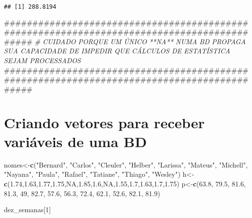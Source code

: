 \documentclass[]{article}
\newenvironment{Shaded}{\begin{snugshade}}{\end{snugshade}}
\newcommand{\KeywordTok}[1]{\textcolor[rgb]{0.13,0.29,0.53}{\textbf{#1}}}
\newcommand{\DecValTok}[1]{\textcolor[rgb]{0.00,0.00,0.81}{#1}}
\newcommand{\FloatTok}[1]{\textcolor[rgb]{0.00,0.00,0.81}{#1}}
\newcommand{\StringTok}[1]{\textcolor[rgb]{0.31,0.60,0.02}{#1}}
\newcommand{\CommentTok}[1]{\textcolor[rgb]{0.56,0.35,0.01}{\textit{#1}}}
\newcommand{\OtherTok}[1]{\textcolor[rgb]{0.56,0.35,0.01}{#1}}
\newcommand{\NormalTok}[1]{#1}
\begin{document}
\begin{verbatim}
## [1] 288.8194
\end{verbatim}

\begin{Shaded}
\begin{Highlighting}[]
\NormalTok{###########################################################################################}
\CommentTok{# CUIDADO PORQUE UM ÚNICO **NA** NUMA BD PROPAGA SUA CAPACIDADE DE IMPEDIR QUE CÁLCULOS DE ESTATÍSTICA SEJAM PROCESSADOS}
\NormalTok{###########################################################################################}
\end{Highlighting}
\end{Shaded}

\section{Criando vetores para receber variáveis de uma
BD}\label{criando-vetores-para-receber-variaveis-de-uma-bd}

\begin{Shaded}
\begin{Highlighting}[]
\NormalTok{nomes<-}\KeywordTok{c}\NormalTok{(}\StringTok{"Bernard"}\NormalTok{,}
\StringTok{"Carlos"}\NormalTok{,}
\StringTok{"Cleuler"}\NormalTok{,}
\StringTok{"Helber"}\NormalTok{,}
\StringTok{"Larissa"}\NormalTok{,}
\StringTok{"Mateus"}\NormalTok{,}
\StringTok{"Michell"}\NormalTok{,}
\StringTok{"Nayana"}\NormalTok{,}
\StringTok{"Paula"}\NormalTok{,}
\StringTok{"Rafael"}\NormalTok{,}
\StringTok{"Tatiane"}\NormalTok{,}
\StringTok{"Thiago"}\NormalTok{,}
\StringTok{"Wesley"}\NormalTok{)}
\NormalTok{h<-}\KeywordTok{c}\NormalTok{(}\FloatTok{1.74}\NormalTok{,}\FloatTok{1.63}\NormalTok{,}\FloatTok{1.77}\NormalTok{,}\FloatTok{1.75}\NormalTok{,}\OtherTok{NA}\NormalTok{,}\FloatTok{1.85}\NormalTok{,}\FloatTok{1.6}\NormalTok{,}\OtherTok{NA}\NormalTok{,}\FloatTok{1.55}\NormalTok{,}\FloatTok{1.7}\NormalTok{,}\FloatTok{1.63}\NormalTok{,}\FloatTok{1.7}\NormalTok{,}\FloatTok{1.75}\NormalTok{)}
\NormalTok{p<-}\KeywordTok{c}\NormalTok{(}\FloatTok{63.8}\NormalTok{,}
\FloatTok{79.5}\NormalTok{,}
\FloatTok{81.6}\NormalTok{,}
\FloatTok{81.3}\NormalTok{,}
\DecValTok{49}\NormalTok{,}
\FloatTok{82.7}\NormalTok{,}
\FloatTok{57.6}\NormalTok{,}
\FloatTok{56.3}\NormalTok{,}
\FloatTok{72.4}\NormalTok{,}
\FloatTok{62.1}\NormalTok{,}
\FloatTok{52.6}\NormalTok{,}
\FloatTok{82.1}\NormalTok{,}
\FloatTok{81.9}\NormalTok{)}

\NormalTok{dez_semanas[}\DecValTok{1}\NormalTok{]}
\end{Highlighting}
\end{Shaded}
\end{document}
